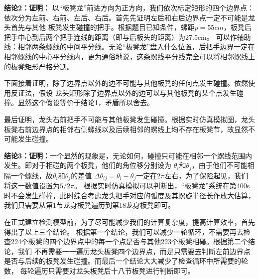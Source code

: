 \documentclass{cumcmthesis1}
\begin{document}
\par
\textbf{结论2：证明：}
以“板凳龙”前进方向为正方向，我们依次标定矩形的四个边界点：依次分为左前、右前、左后、右后。首先先证明左后和右后边界点一定不可能是龙头首先与其他
板凳发生碰撞的把手。根据题目已知条件，螺距$p=55cm$，板凳后把手中心到后两个把手连线的距离（即与后板头的距离）为27.5cm。
可以作辅助线：相邻两条螺线的中间平分线。无论“板凳龙”盘入什么位置，后把手边界一定在相邻螺线的中心平分线内，更为通俗地说，这条螺线平分线完全可以将相邻螺线上的板凳矩形严格分割。
\par
下面接着证明，除了边界点以外的边不可能与其他板凳的任何点发生碰撞。依然使用反证法，假设
龙头矩形除了边界点以外的边可以与其他板凳的某个点发生碰撞。显然这个假设等价于结论1，矛盾所以舍去。
\par
最后证明，龙头右前把手不可能与其他板凳发生碰撞。根据实时仿真模拟图，龙头板凳右前边界点的相邻右侧螺线以及后续相邻的螺线上均不存在板凳节，故显然不可能发生碰撞。
\par
\textbf{结论3：证明：}一个显然的现象是，无论如何，碰撞只可能在相邻一个螺线范围内发生。即对于相碰的两个板凳，他们的角位移分别设为
$\theta_i$和$\theta_j$，由于他们不可能相隔一个螺线，故$\theta_i$和$\theta_j$的差值
$\Delta \theta_{ij}=\theta_i-\theta_j$一定在$2 \pi$左右，为了保险起见，我们将这一数值设置为$5/2 \pi$。
根据实时仿真模拟可以判断出，“板凳龙”系统在第400s时不会发生碰撞，此时综合考虑龙头把手对应的弧度及其螺旋半径长作放大估算，我们只需要从第1节龙身板凳遍历到第18龙身板凳即可。
\par
在正式建立检测模型前，为了尽可能减少我们的计算复杂度，提高计算效率，首先得出了以上三个结论。
根据第一个结论，我们可以减少一轮循环，不需要再去检查224个板凳的四个边界点中的每一个点是否与其他223个板凳相碰。根据第二个结论，我们
不再需要一一遍历龙头板凳四个边界点，而是只需要去判断左前边界点是否与后续的板凳发生碰撞。而最后一个结论大大减少了检查循环中所需要的轮数，
每轮遍历只需要对龙头板凳后十八节板凳进行判断即可。
\end{document}
